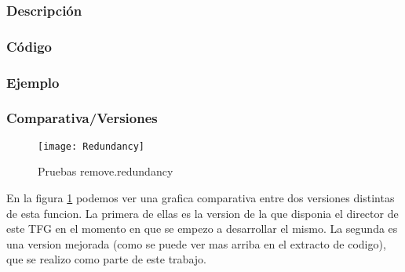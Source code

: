 \subsubsection{Descripci\'on} 
\newpage
\subsubsection{C\'odigo} 

\newpage
\subsubsection{Ejemplo} 
\subsubsection{Comparativa/Versiones} 
\begin{figure}[h]
    \centering
    \texttt{[image: Redundancy]}
    \caption{Pruebas remove.redundancy}
    \label{fig:redundancy}
\end{figure} 

En la figura \ref{fig:redundancy} podemos ver una grafica comparativa entre dos versiones distintas de esta funcion. La primera de ellas es la version de la que disponia el director de este TFG en el momento en que se empezo a desarrollar el mismo. La segunda es una version mejorada (como se puede ver mas arriba en el extracto de codigo), que se realizo como parte de este trabajo.